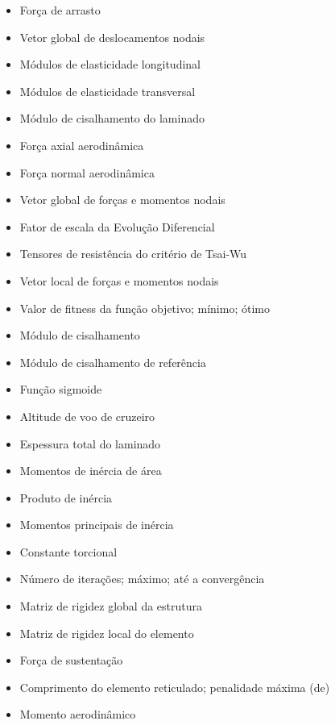 {\begin{itemize}[
        labelwidth=1.5cm,
        align=left,
        itemindent=0cm,
        leftmargin=2cm,
        itemsep=0em
    ]
    \item[$\vv{D}$] Força de arrasto
    \item[$\{\mathbf{d}\}$] Vetor global de deslocamentos nodais
    \item[$E_1, E_x$] Módulos de elasticidade longitudinal
    \item[$E_2, E_y$] Módulos de elasticidade transversal
    \item[$E_s$] Módulo de cisalhamento do laminado
    \item[$\vv{F_A}$] Força axial aerodinâmica
    \item[$\vv{F_N}$] Força normal aerodinâmica
    \item[$\{\mathbf{F}\}$] Vetor global de forças e momentos nodais
    \item[$F$] Fator de escala da Evolução Diferencial
    \item[$F_i, F_{ij}$] Tensores de resistência do critério de Tsai-Wu
    \item[$\{\mathbf{f}\}$] Vetor local de forças e momentos nodais
    \item[$f(\mathrm{X})$; $f_\text{min}$; $f^\star$]
    Valor de fitness da função objetivo; mínimo; ótimo
    \item[$G$] Módulo de cisalhamento
    \item[$G_\mathrm{REF}$] Módulo de cisalhamento de referência
    \item[$g(z)$] Função sigmoide
    \item[$H_C$] Altitude de voo de cruzeiro
    \item[$h$] Espessura total do laminado
    \item[$I_{xx}, I_{yy}$] Momentos de inércia de área
    \item[$I_{xy}$] Produto de inércia
    \item[$I_{1,2}$] Momentos principais de inércia
    \item[$J$] Constante torcional
    \item[$k$; $k_\text{max}$; $k_\text{conv}$]
    Número de iterações; máximo; até a convergência
    \item[$\mathbf{[K]}$] Matriz de rigidez global da estrutura
    \item[$\mathbf{[k]}$] Matriz de rigidez local do elemento
    \item[$\vv{L}$] Força de sustentação
    \item[$L$] Comprimento do elemento reticulado;
    penalidade máxima (\acrshort{de})
    \item[$\vv{M_a}$] Momento aerodinâmico

\end{itemize}}
